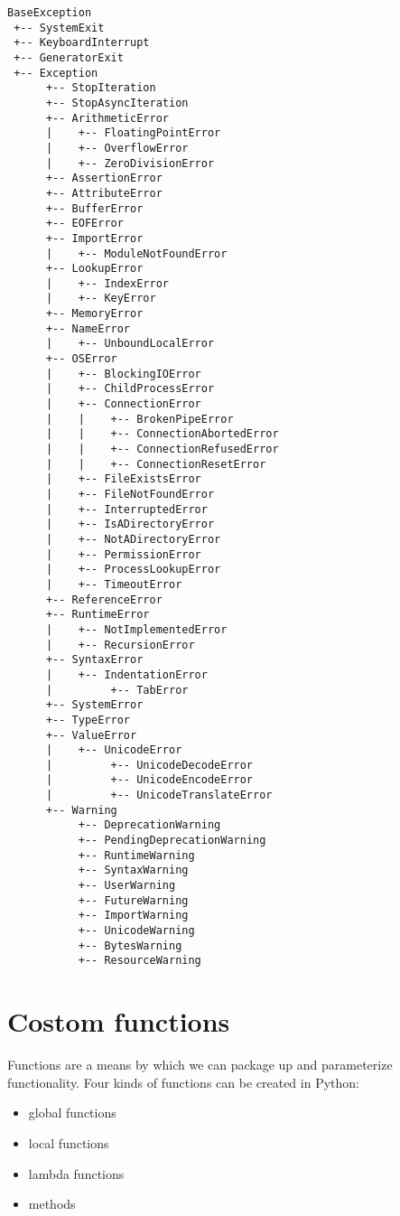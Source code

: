 \begin{verbatim}
BaseException
 +-- SystemExit
 +-- KeyboardInterrupt
 +-- GeneratorExit
 +-- Exception
      +-- StopIteration
      +-- StopAsyncIteration
      +-- ArithmeticError
      |    +-- FloatingPointError
      |    +-- OverflowError
      |    +-- ZeroDivisionError
      +-- AssertionError
      +-- AttributeError
      +-- BufferError
      +-- EOFError
      +-- ImportError
      |    +-- ModuleNotFoundError
      +-- LookupError
      |    +-- IndexError
      |    +-- KeyError
      +-- MemoryError
      +-- NameError
      |    +-- UnboundLocalError
      +-- OSError
      |    +-- BlockingIOError
      |    +-- ChildProcessError
      |    +-- ConnectionError
      |    |    +-- BrokenPipeError
      |    |    +-- ConnectionAbortedError
      |    |    +-- ConnectionRefusedError
      |    |    +-- ConnectionResetError
      |    +-- FileExistsError
      |    +-- FileNotFoundError
      |    +-- InterruptedError
      |    +-- IsADirectoryError
      |    +-- NotADirectoryError
      |    +-- PermissionError
      |    +-- ProcessLookupError
      |    +-- TimeoutError
      +-- ReferenceError
      +-- RuntimeError
      |    +-- NotImplementedError
      |    +-- RecursionError
      +-- SyntaxError
      |    +-- IndentationError
      |         +-- TabError
      +-- SystemError
      +-- TypeError
      +-- ValueError
      |    +-- UnicodeError
      |         +-- UnicodeDecodeError
      |         +-- UnicodeEncodeError
      |         +-- UnicodeTranslateError
      +-- Warning
           +-- DeprecationWarning
           +-- PendingDeprecationWarning
           +-- RuntimeWarning
           +-- SyntaxWarning
           +-- UserWarning
           +-- FutureWarning
           +-- ImportWarning
           +-- UnicodeWarning
           +-- BytesWarning
           +-- ResourceWarning
\end{verbatim}


\section{Costom functions}

Functions are a means by which we can package up and parameterize functionality.
Four kinds of functions can be created in Python:
\begin{itemize}
\item global functions
\item local functions
\item lambda functions
\item methods
\end{itemize}



